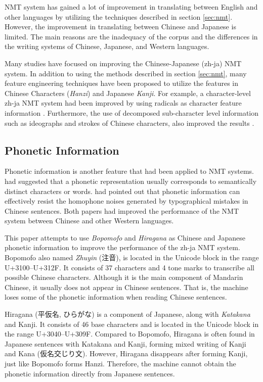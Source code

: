 NMT system has gained a lot of improvement in translating between English and other languages by utilizing the techniques described in section \ref{sec:nmt}. However, the improvement in translating between Chinese and Japanese is limited. The main reasons are the inadequacy of the corpus and the differences in the writing systems of Chinese, Japanese, and Western languages.

Many studies have focused on improving the Chinese-Japanese (zh-ja) NMT system. In addition to using the methods \cite{imamura2018enhancement, chu2017empirical, zhang2020parallel} described in section \ref{sec:nmt}, many feature engineering techniques have been proposed to utilize the features in Chinese Characters (\textit{Hanzi}) and Japanese \textit{Kanji}. For example, a character-level zh-ja NMT system had been improved by using radicals as character feature information \cite{8300572}. Furthermore, the use of decomposed sub-character level information such as ideographs and strokes of Chinese characters, also improved the results \cite{zhang-komachi-2018-neural}.

\subsection{Phonetic Information}

Phonetic information is another feature that had been applied to NMT systems. \cite{khan2019diversity} had suggested that a phonetic representation usually corresponds to semantically distinct characters or words. \cite{liu-etal-2019-robust} had pointed out that phonetic information can effectively resist the homophone noises generated by typographical mistakes in Chinese sentences. Both papers had improved the performance of the NMT system between Chinese and other Western languages.

This paper attempts to use \textit{Bopomofo} and \textit{Hiragana} as Chinese and Japanese phonetic information to improve the performance of the zh-ja NMT system. Bopomofo also named \textit{Zhuyin} (注音), is located in the Unicode block in the range U+3100–U+312F. It consists of 37 characters and 4 tone marks to transcribe all possible Chinese characters. Although it is the main component of Mandarin Chinese, it usually does not appear in Chinese sentences. That is, the machine loses some of the phonetic information when reading Chinese sentences. \begin{CJK}{UTF8}{song}
Hiragana (平仮名, ひらがな) is a component of Japanese, along with \textit{Katakana} and Kanji. It consists of 46 base characters and is located in the Unicode block in the range U+3040–U+309F. Compared to Bopomofo, Hiragana is often found in Japanese sentences with Katakana and Kanji, forming mixed writing of Kanji and Kana (仮名交じり文). However, Hiragana disappears after forming Kanji, just like Bopomofo forms Hanzi. Therefore, the machine cannot obtain the phonetic information directly from Japanese sentences.
\end{CJK}


